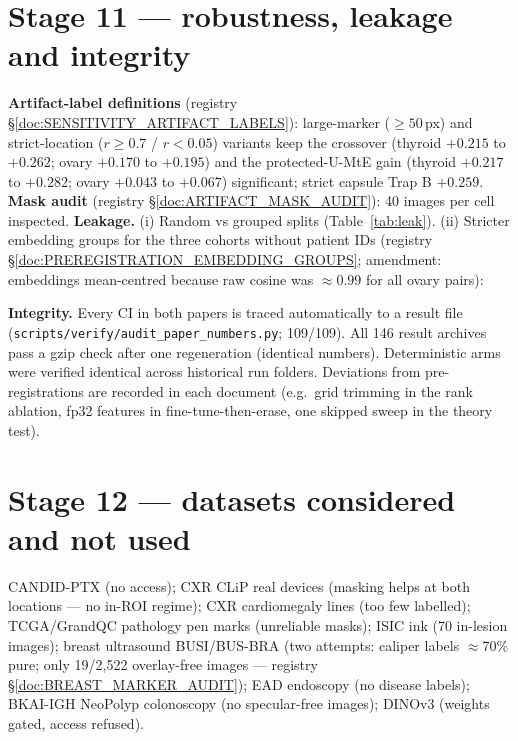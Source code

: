 \documentclass[10pt,a4paper]{article}
\begin{document}



\section{Stage 11 --- robustness, leakage and integrity}\label{sec:robust}
\textbf{Artifact-label definitions} (registry \S\ref{doc:SENSITIVITY_ARTIFACT_LABELS}): large-marker ($\ge50$\,px) and
strict-location ($r\ge0.7$ / $r<0.05$) variants keep the crossover (thyroid $+0.215$ to $+0.262$; ovary $+0.170$ to $+0.195$)
and the protected-U-MtE gain (thyroid $+0.217$ to $+0.282$; ovary $+0.043$ to $+0.067$) significant; strict capsule Trap B
$+0.259$. \textbf{Mask audit} (registry \S\ref{doc:ARTIFACT_MASK_AUDIT}): 40 images per cell inspected.
\textbf{Leakage.} (i) Random vs grouped splits (Table~\ref{tab:leak}). (ii) Stricter embedding groups for the three cohorts
without patient IDs (registry \S\ref{doc:PREREGISTRATION_EMBEDDING_GROUPS}; amendment: embeddings mean-centred because raw
cosine was $\approx0.99$ for all ovary pairs):


\textbf{Integrity.} Every CI in both papers is traced automatically to a result file (\texttt{scripts/verify/audit\_paper\_numbers.py};
109/109). All 146 result archives pass a gzip check after one regeneration (identical numbers). Deterministic arms were
verified identical across historical run folders. Deviations from pre-registrations are recorded in each document
(e.g.\ grid trimming in the rank ablation, fp32 features in fine-tune-then-erase, one skipped sweep in the theory test).

\section{Stage 12 --- datasets considered and not used}
CANDID-PTX (no access); CXR CLiP real devices (masking helps at both locations --- no in-ROI regime); CXR cardiomegaly lines
(too few labelled); TCGA/GrandQC pathology pen marks (unreliable masks); ISIC ink (70 in-lesion images); breast ultrasound
BUSI/BUS-BRA (two attempts: caliper labels $\approx$70\% pure; only 19/2{,}522 overlay-free images --- registry
\S\ref{doc:BREAST_MARKER_AUDIT}); EAD endoscopy (no disease labels); BKAI-IGH NeoPolyp colonoscopy (no specular-free images);
DINOv3 (weights gated, access refused).
\end{document}
